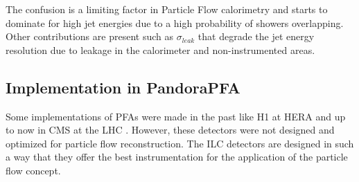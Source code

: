 The confusion is a limiting factor in Particle Flow calorimetry and starts to dominate for high jet energies due to a high probability of showers overlapping. Other contributions are present such as $\sigma_{leak}$ that degrade the jet energy resolution due to leakage in the calorimeter and non-instrumented areas.

\subsection{Implementation in PandoraPFA}

Some implementations of PFAs were made in the past like H1 at HERA \cite{Abt:1994ye} and up to now in CMS at the LHC \cite{Sirunyan:2017ulk}. However, these detectors were not designed and optimized for particle flow reconstruction. The ILC detectors are designed in such a way that they offer the best instrumentation for the application of the particle flow concept.

